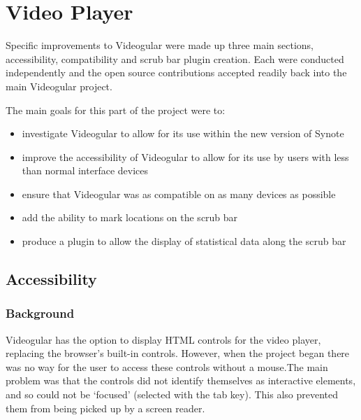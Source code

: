 \chapter{Video Player} 
\label{Chapter:Video Player}


Specific improvements to \gls{Videogular} were made up three main sections, accessibility, compatibility and scrub bar plugin creation. Each were conducted independently and the open source contributions accepted readily back into the main \gls{Videogular} project.

The main goals for this part of the project were to:
\begin{itemize}
\item investigate \gls{Videogular} to allow for its use within the new version of Synote
\item improve the accessibility of \gls{Videogular} to allow for its use by users with less than normal interface  devices
\item ensure that \gls{Videogular} was as compatible on as many devices as possible
\item add the ability to mark locations on the scrub bar
\item produce a plugin to allow the display of statistical data along the scrub bar
\end{itemize}


\section{Accessibility} 
\label{Section:Accessibility}

\subsection{Background} 
\gls{Videogular} has the option to display HTML controls for the video player, replacing the browser's built-in controls. However, when the project began there was no way for the user to access these controls without a mouse.The main problem was that the controls did not identify themselves as interactive elements, and so could not be `focused' (selected with the tab key). This also prevented them from being picked up by a screen reader.

